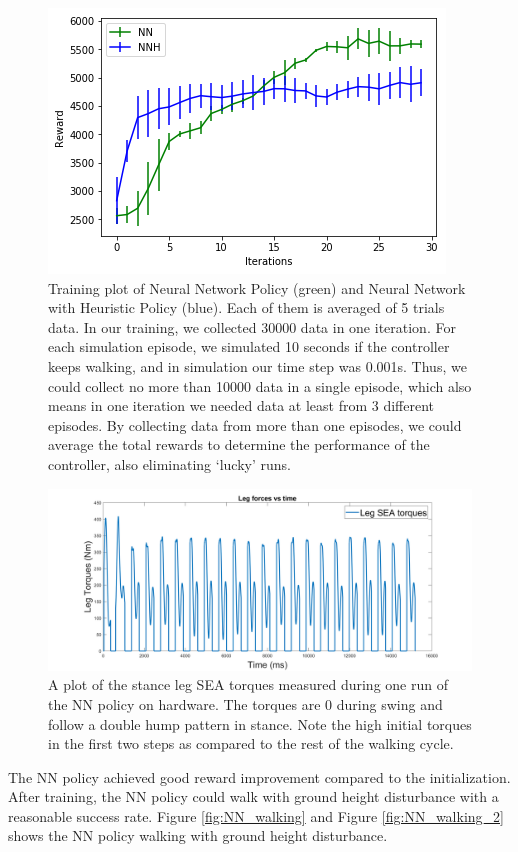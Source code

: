 \begin{figure}[t]
	\centering
	\includegraphics[width=.65\textwidth]{img/NN_H_reward.png}
    \caption{Training plot of Neural Network Policy (green) and Neural Network with Heuristic Policy (blue). Each of them is averaged of 5 trials data. In our training, we collected 30000 data in one iteration. For each simulation episode, we simulated 10 seconds if the controller keeps walking, and in simulation our time step was 0.001s. Thus, we could collect no more than 10000 data in a single episode, which also means in one iteration we needed data at least from 3 different episodes. By collecting data from more than one episodes, we could average the total rewards to determine the performance of the controller, also eliminating `lucky' runs.}
    \label{fig:Reward}
\end{figure}

\begin{figure}[t]
	\centering
	\includegraphics[width=.65\textwidth]{img/leg_force_profie.png}
    \caption{A plot of the stance leg SEA torques measured during one run of the NN policy on hardware. The torques are 0 during swing and follow a double hump pattern in stance. Note the high initial torques in the first two steps as compared to the rest of the walking cycle.}
    \label{fig:NN_walking_hw}
\end{figure}
The NN policy achieved good reward improvement compared to the initialization. After training, the NN policy could walk with ground height disturbance with a reasonable success rate. Figure \ref{fig:NN_walking} and Figure \ref{fig:NN_walking_2} shows the NN policy walking with ground height disturbance.


